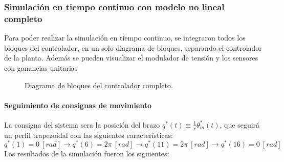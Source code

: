 \documentclass[a4paper, 10pt, onecolumn,journal]{ieeeconf}
\begin{document}
\subsubsection{\textbf{Simulación en tiempo continuo con modelo no lineal completo}}
Para poder realizar la simulación en tiempo continuo, se integraron todos los bloques del controlador, en un solo diagrama de bloques, separando el controlador de la planta. Además se pueden visualizar el modulador de tensión y los sensores con ganancias unitarias 
\begin{figure}[H]
	\centering
	\begin{adjustbox}{max width=\columnwidth}
	\end{adjustbox}
	\caption{Diagrama de bloques del controlador completo.}
	\label{Diagrama de bloques del controlador completo}
\end{figure}


\paragraph{\textbf{Seguimiento de consignas de movimiento}}
La consigna del sistema sera la posición del brazo ${q^*}(t) \equiv \frac{1}{r} {\theta^*_m}(t)$, que seguirá un perfil trapezoidal con las siguientes características:
\begin{equation}
	{q^*}(1)=0 \: [rad] \longrightarrow {q^*}(6)=2 \pi \: [rad] \longrightarrow {q^*}(11)=2 \pi \: [rad]\longrightarrow {q^*}(16)=0 \: [rad]
\end{equation}
Los resultados de la simulación fueron los siguientes:
\end{document}
